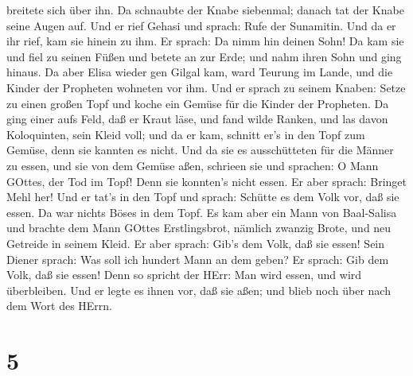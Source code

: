 breitete sich über ihn. Da schnaubte der Knabe siebenmal; danach tat der
Knabe seine Augen auf.  Und er rief Gehasi und sprach: Rufe
der Sunamitin. Und da er ihr rief, kam sie hinein zu ihm. Er sprach: Da
nimm hin deinen Sohn!  Da kam sie und fiel zu seinen Füßen
und betete an zur Erde; und nahm ihren Sohn und ging hinaus.
 Da aber Elisa wieder gen Gilgal kam, ward Teurung im
Lande, und die Kinder der Propheten wohneten vor ihm. Und er sprach zu
seinem Knaben: Setze zu einen großen Topf und koche ein Gemüse für die
Kinder der Propheten.  Da ging einer aufs Feld, daß er
Kraut läse, und fand wilde Ranken, und las davon Koloquinten, sein Kleid
voll; und da er kam, schnitt er's in den Topf zum Gemüse, denn sie
kannten es nicht.  Und da sie es ausschütteten für die
Männer zu essen, und sie von dem Gemüse aßen, schrieen sie und sprachen:
O Mann GOttes, der Tod im Topf! Denn sie konnten's nicht essen.
 Er aber sprach: Bringet Mehl her! Und er tat's in den Topf
und sprach: Schütte es dem Volk vor, daß sie essen. Da war nichts Böses
in dem Topf.  Es kam aber ein Mann von Baal-Salisa und
brachte dem Mann GOttes Erstlingsbrot, nämlich zwanzig Brote, und neu
Getreide in seinem Kleid. Er aber sprach: Gib's dem Volk, daß sie essen!
 Sein Diener sprach: Was soll ich hundert Mann an dem
geben? Er sprach: Gib dem Volk, daß sie essen! Denn so spricht der HErr:
Man wird essen, und wird überbleiben.  Und er legte es
ihnen vor, daß sie aßen; und blieb noch über nach dem Wort des HErrn.

\hypertarget{section-4}{%
\section{5}\label{section-4}}

